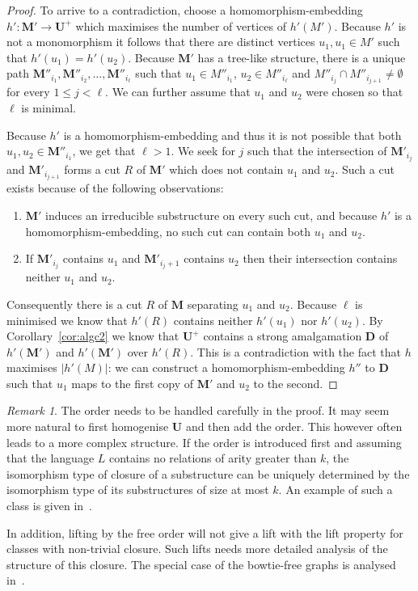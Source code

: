 \documentclass{elsarticle}
\def\str#1{\mathbf {#1}}
\theoremstyle{plain}
\theoremstyle{definition}
\theoremstyle{remark}
\newtheorem*{remark}{Remark}
\begin{document}
\begin{proof}
To arrive to a contradiction, choose a homomorphism-embedding $h'\colon\str{M}'\to \str{U}^+$ which maximises the number of vertices of $h'(M')$.
Because $h'$ is not a monomorphism it follows that there are distinct vertices $u_1,u_1\in M'$ such that $h'(u_1)=h'(u_2)$.
Because $\str{M}'$ has a tree-like structure, there is a unique path $\str{M}''_{i_1},\str{M}''_{i_2},\ldots,\str{M}''_{i_\ell}$ such that $u_1\in M''_{i_1}$, $u_2\in M''_{i_\ell}$ and $M''_{i_j}\cap M''_{i_{j+1}}\neq \emptyset$ for every $1\leq j<\ell$.
We can further assume that $u_1$ and $u_2$ were chosen so that $\ell$ is minimal.

Because $h'$ is a homomorphism-embedding and thus it is not possible that both $u_1,u_2\in \str{M}''_{i_1}$, we get that $\ell>1$.  We seek for $j$ such that the
intersection of $\str{M}'_{i_j}$ and $\str{M}'_{i_{j+1}}$ forms a cut $R$ of
$\str{M}'$ which does not contain $u_1$ and $u_2$. Such a cut exists because of the following observations:
\begin{enumerate}
\item $\str{M}'$ induces an irreducible substructure on every such cut,
and because $h'$ is a homomorphism-embedding, no such cut can contain both $u_1$ and $u_2$. 
\item If $\str{M}'_{i_j}$ contains $u_1$ and $\str{M}'_{i_j+1}$ contains $u_2$ then their intersection contains neither $u_1$ and $u_2$.  
\end{enumerate}

Consequently there is a cut $R$ of $\str{M}$ separating $u_1$ and $u_2$. Because $\ell$ is minimised
we know that $h'(R)$ contains neither $h'(u_1)$ nor $h'(u_2)$.
By Corollary~\ref{cor:algc2} we know that $\str{U}^+$ contains a strong amalgamation $\str{D}$ of $h'(\str{M}')$ and $h'(\str{M}')$ over $h'(R)$. This is a contradiction with the fact that $h$ maximises $|h'(M)|$: we can construct a homomorphism-embedding $h''$ to $\str{D}$ such that $u_1$ maps to the first copy of $\str{M}'$ and $u_2$ to the second.
\end{proof}

\begin{remark}
The order needs to be handled carefully in the proof. It may seem more natural
to first homogenise $\str{U}$ and then add the order. This however often leads
to a more complex structure. If the order is introduced first and
assuming that the language
$L$ contains no relations of arity greater than $k$, the isomorphism type of
closure of a substructure can be uniquely determined by the isomorphism type of
its substructures of size at most $k$. An example of such a class is given in~\cite{Hubivcka2014}.

In addition, lifting by the free order will not give a lift with the lift property for classes
with non-trivial closure.  Such lifts needs more
detailed analysis of the structure of this closure. The special case of the bowtie-free
graphs is analysed in~\cite{Hubivcka2014}.
\end{remark}
\end{document}
